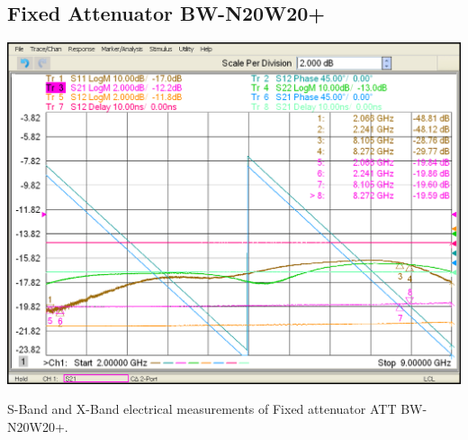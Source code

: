 





\subsection{Fixed Attenuator BW-N20W20+}

\begin{table}[H]
	\centering
	\includegraphics[width=0.8\linewidth]{figuras/measures/ATT BW-N20W20+}
	\caption{S-Band and X-Band electrical measurements of Fixed attenuator ATT BW-N20W20+.}
	\label{fig:ATT BW-N20W20+}
\end{table}

